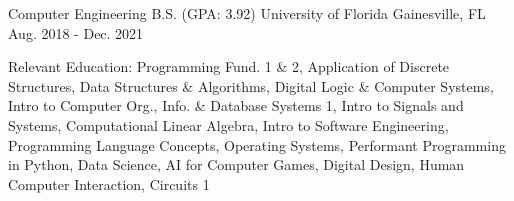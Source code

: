 \begin{cventries}
  \cventry
	{Computer Engineering B.S. (GPA: 3.92)}
	{University of Florida}
	{Gainesville, FL}
	{Aug. 2018 - Dec. 2021}
	{
		\begin{cvitems}
			\item {Relevant Education: Programming Fund. 1 \& 2, Application of Discrete Structures, Data Structures \& Algorithms, Digital Logic \& Computer Systems, Intro to Computer Org., Info. \& Database Systems 1, Intro to Signals and Systems, Computational Linear Algebra, Intro to Software Engineering, Programming Language Concepts, Operating Systems, Performant Programming in Python, Data Science, AI for Computer Games, Digital Design, Human Computer Interaction, Circuits 1}
		\end{cvitems}
	}
\end{cventries}
